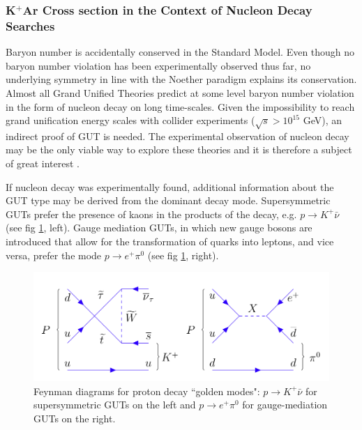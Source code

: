\subsubsection{K$^{+}$Ar Cross section in the Context of Nucleon Decay Searches}
\label{sec:theoryPDK}
Baryon number is accidentally conserved in the Standard Model. Even though no baryon number violation has been experimentally observed thus far, no underlying symmetry in line with the Noether paradigm \cite{Noether1971} explains its conservation. Almost all Grand Unified Theories predict at some level baryon number violation in the form of nucleon decay on long time-scales.  Given the impossibility to reach grand unification energy scales with collider experiments ($\sqrt{s} > 10^{15}$ GeV),  an indirect proof of GUT is needed. The experimental observation of nucleon decay may be the only viable way to explore these theories and it is therefore a subject of great interest \cite{Adams:LBNE}. %

If nucleon decay was experimentally found, additional information about the GUT type may be derived from the dominant decay mode. 
Supersymmetric GUTs \cite{Dimopoulos:1981dw,Bajc20161} prefer the presence of kaons in the products of the decay, e.g. $p\rightarrow K^+\bar{\nu}$  (see fig \ref{fig:MandatoryFeynmannDiagrams}, left).
Gauge mediation GUTs, in which new gauge bosons are introduced that allow for the transformation of quarks into leptons, and vice versa, prefer the mode $p\rightarrow e^+\pi^0$ (see fig \ref{fig:MandatoryFeynmannDiagrams}, right).



\begin{figure}[hbpt]
\centering
\includegraphics[width=6.5in]{images/MandatoryFeynmannDiagrams.png}
\caption{Feynman diagrams for proton decay ``golden modes": $p \rightarrow K^+ \bar{\nu}$ for supersymmetric GUTs on the left and  $p \rightarrow e^+ \pi^0$ for gauge-mediation GUTs  on the right.}
\label{fig:MandatoryFeynmannDiagrams}
\end{figure}

